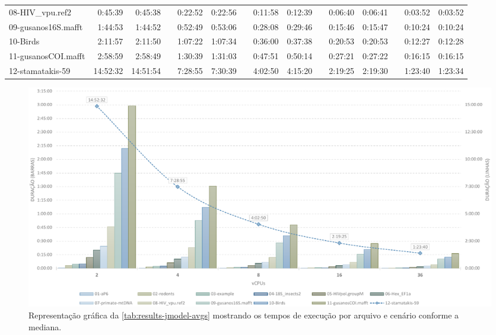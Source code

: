 \documentclass[english,brazilian]{UNISINOSmonografia} %
\begin{document}
{\begin{landscape}
\begin{table}
\begin{minipage}{\linewidth}
\begin{tabular*}{\linewidth}{@{\extracolsep{\fill}}lrrcrrcrrcrrcrr@{}}
					08-HIV\_vpu.ref2 & 0:45:39 & 0:45:38 &  & 0:22:52 & 0:22:56 &  & 0:11:58 & 0:12:39 &  & 0:06:40 & 0:06:41 &  & 0:03:52 & 0:03:52 \\
					09-gusanos16S.mafft & 1:44:53 & 1:44:52 &  & 0:52:49 & 0:53:06 &  & 0:28:08 & 0:29:46 &  & 0:15:46 & 0:15:47 &  & 0:10:24 & 0:10:24 \\
					10-Birds & 2:11:57 & 2:11:50 &  & 1:07:22 & 1:07:34 &  & 0:36:00 & 0:37:38 &  & 0:20:53 & 0:20:53 &  & 0:12:27 & 0:12:28 \\
					11-gusanosCOI.mafft & 2:58:59 & 2:58:49 &  & 1:30:39 & 1:31:03 &  & 0:47:51 & 0:50:14 &  & 0:27:21 & 0:27:22 &  & 0:16:15 & 0:16:15 \\
					12-stamatakis-59 & 14:52:32 & 14:51:54 &  & 7:28:55 & 7:30:39 &  & 4:02:50 & 4:15:20 &  & 2:19:25 & 2:19:30 &  & 1:23:40 & 1:23:34 \\
					\bottomrule
				\end{tabular*}
			\end{minipage}
		\end{table}
		
		\begin{figure}[bt]
			\centering%
			\begin{minipage}{\linewidth}
				\caption{Representação gráfica da \autoref{tab:results-jmodel-avgs} mostrando os tempos de execução por arquivo e cenário conforme a mediana.}
				\label{fig:results-jmodel-avgs}
				\vspace{1ex}
				\includegraphics[width=\linewidth]{results-jmodel-avgs}
			\end{minipage}
		\end{figure}
		
	\end{landscape}
}
\end{document}
